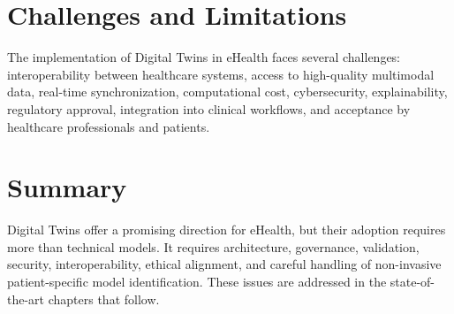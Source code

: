 \section{Challenges and Limitations}
The implementation of Digital Twins in eHealth faces several challenges: interoperability between healthcare systems, access to high-quality multimodal data, real-time synchronization, computational cost, cybersecurity, explainability, regulatory approval, integration into clinical workflows, and acceptance by healthcare professionals and patients.

\section{Summary}
Digital Twins offer a promising direction for eHealth, but their adoption requires more than technical models. It requires architecture, governance, validation, security, interoperability, ethical alignment, and careful handling of non-invasive patient-specific model identification. These issues are addressed in the state-of-the-art chapters that follow.

\clearpage

